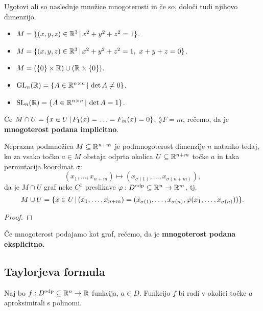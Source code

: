 \begin{zgled}
    Ugotovi ali so naslednje množice mnogoterosti in če so, določi tudi njihovo dimenzijo.
    \begin{itemize}
        \item $M = \{(x,y,z) \in \mathbb{R}^3 \,|\, x^2+y^2+z^2 = 1\}$.
        \item $M = \{(x,y,z) \in \mathbb{R}^3 \,|\, x^2+y^2+z^2 = 1, \ x+y+z = 0\}$.
        \item $M = (\{0\} \times \mathbb{R}) \cup (\mathbb{R} \times \{0\})$.
        \item $\operatorname{GL}_n(\mathbb{R}) = \{A \in \mathbb{R}^{n \times n} \,|\, \det A \neq 0\}$.
        \item $\operatorname{SL}_n(\mathbb{R}) = \{A \in \mathbb{R}^{n \times n} \,|\, \det A = 1\}$.
    \end{itemize}
\end{zgled}

\begin{opomba}
    Če $M \cap U = \{x \in U \,|\, F_1(x) = \ldots = F_m(x) = 0\}$, \(\rang F = m\), rečemo, da je \textbf{mnogoterost podana implicitno}.
\end{opomba}

\begin{trditev}
    Neprazna podmnožica \(M \subseteq \mathbb{R}^{n+m}\) je podmnogoterost dimenzije \(n\) natanko tedaj, ko za vsako točko \(a \in M\) obstaja odprta okolica \(U \subseteq \mathbb{R}^{n+m}\) točke \(a\) in taka permutacija koordinat \(\sigma\):
    \[
        (x_1, \ldots, x_{n+m}) \mapsto (x_{\sigma(1)}, \ldots, x_{\sigma(n+m)}),
    \] 
    da je \(M \cap U\) graf neke \(C^1\) preslikave \(\varphi: D^\text{odp} \subseteq \mathbb{R}^n \to \mathbb{R}^m\), tj.\ 
    \[
        M \cup U = \{x \in U \,|\, (x_1, \ldots, x_{n+m}) = (x_{\sigma(1)}, \ldots, x_{\sigma(n)}, \varphi(x_1, \ldots, x_{\sigma(n)}))\}.
    \]
\end{trditev}

\begin{proof}
    \todo{}
\end{proof}

\begin{opomba}
    Če mnogoterost podajamo kot graf, rečemo, da je \textbf{mnogoterost podana eksplicitno.}
\end{opomba}

\newpage
\subsection{Taylorjeva formula}
Naj bo $f: D^{\text{odp}} \subseteq \mathbb{R}^n \to \mathbb{R}$ funkcija, $a \in D$. Funkcijo $f$ bi radi v okolici točke $a$ aproksimirali s polinomi.

